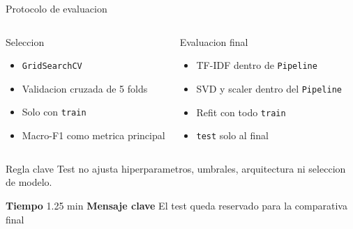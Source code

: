 \documentclass[aspectratio=169,10pt]{beamer}
\newcommand{\slidemeta}[2]{
  \vfill
  {\scriptsize\color{Muted}\textbf{Tiempo} #1 \hfill \textbf{Mensaje clave} #2}
}
\begin{document}
\begin{frame}{Protocolo de evaluacion}
  \begin{columns}[T,onlytextwidth]
    \begin{block}{Seleccion}
      \begin{itemize}
        \item \texttt{GridSearchCV}
        \item Validacion cruzada de 5 folds
        \item Solo con \texttt{train}
        \item Macro-F1 como metrica principal
      \end{itemize}
    \end{block}
    \begin{block}{Evaluacion final}
      \begin{itemize}
        \item TF-IDF dentro de \texttt{Pipeline}
        \item SVD y scaler dentro del \texttt{Pipeline}
        \item Refit con todo \texttt{train}
        \item \texttt{test} solo al final
      \end{itemize}
    \end{block}
  \end{columns}
  \vspace{0.25cm}
  \begin{block}{Regla clave}
    Test no ajusta hiperparametros, umbrales, arquitectura ni seleccion de modelo.
  \end{block}
  \slidemeta{1.25 min}{El test queda reservado para la comparativa final}
\end{frame}
\end{document}
